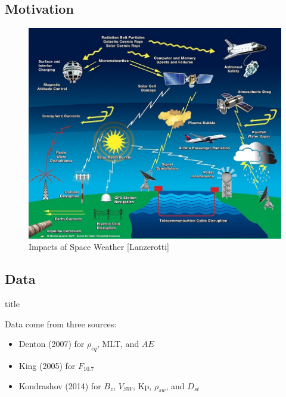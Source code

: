 \documentclass[xcolor={dvipsnames,table}]{beamer}
\newcommand{\subheader}{    		\begin{center}
  	\begin{beamercolorbox}[sep=4pt,center,shadow=true,rounded=true]{title}
  		\usebeamerfont{title}\subsecname\par%
  	\end{beamercolorbox}
  	\vfill
  	\end{center}}
\newcommand{\req}{\ensuremath{\rho_{eq}}} %
\newcommand{\f}{\ensuremath{F_{10.7}}} %
\begin{document}
\subsection{Motivation}
\begin{frame}
	\begin{figure}
		\centering
		\includegraphics[width=0.75\linewidth]{Figures/TE_space_weather_diagram}
		\caption{Impacts of Space Weather [Lanzerotti]}
		\label{fig:TE_space_weather_diagram}
	\end{figure}
\end{frame}




\subsection{Data}

\begin{frame}
	\subheader
	Data come from three sources:
	\small
	\begin{itemize}
		\item Denton (2007) for \req, MLT, and $AE$ \\
		\item King (2005) for \f
		\item Kondrashov (2014) for $B_z$, $V_{SW}$, Kp, $\rho_{sw}$, and $D_{st}$ \\
	\end{itemize}
\end{frame}
\end{document}
